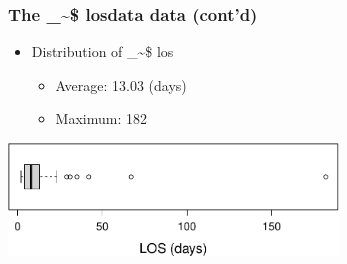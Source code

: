 \documentclass[framenumber,t]{beamer}
\makeatletter
\newcommand\code{\bgroup\@makeother\_\@makeother\~\@makeother\$\@makeother\^\@codex}
\def\@codex#1{{\normalfont\ttfamily\hyphenchar\font=-1 #1}\egroup}
\makeatother
\begin{document}
\begin{frame}
\frametitle{The \code{losdata} data {\small (cont'd)}}
    \begin{itemize}
        \setlength\itemsep{0.1em}
        \vspace{0.5em}
        \item \alert{Distribution} of \code{los}
        \begin{itemize}
            \setlength\itemsep{0.5em}
            \item Average: 13.03 (days)
            \item Maximum: 182
        \end{itemize}
    \end{itemize}

    \begin{center}
        \includegraphics[height=3cm]{figure/boxplot_los}
    \end{center}
\end{frame}
\end{document}
